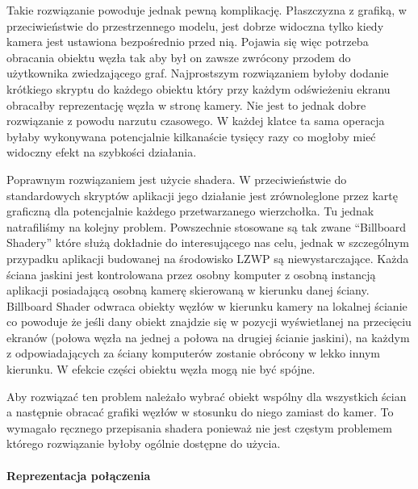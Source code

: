 Takie rozwiązanie powoduje jednak pewną komplikację. Płaszczyzna z grafiką, w przeciwieństwie do przestrzennego modelu, jest dobrze widoczna tylko kiedy kamera jest ustawiona bezpośrednio przed nią. Pojawia się więc potrzeba obracania obiektu węzła tak aby był on zawsze zwrócony przodem do użytkownika zwiedzającego graf. Najprostszym rozwiązaniem byłoby dodanie krótkiego skryptu do każdego obiektu który przy każdym odświeżeniu ekranu obracałby reprezentację węzła w stronę kamery. Nie jest to jednak dobre rozwiązanie z powodu narzutu czasowego. W każdej klatce ta sama operacja byłaby wykonywana potencjalnie kilkanaście tysięcy razy co mogłoby mieć widoczny efekt na szybkości działania.

Poprawnym rozwiązaniem jest użycie shadera. W przeciwieństwie do standardowych skryptów aplikacji jego działanie jest zrównoleglone przez kartę graficzną dla potencjalnie każdego przetwarzanego wierzchołka. Tu jednak natrafiliśmy na kolejny problem. Powszechnie stosowane są tak zwane ``Billboard Shadery'' które służą dokładnie do interesującego nas celu, jednak w szczególnym przypadku aplikacji budowanej na środowisko LZWP są niewystarczające. Każda ściana jaskini jest kontrolowana przez osobny komputer z osobną instancją aplikacji posiadającą osobną kamerę skierowaną w kierunku danej ściany. Billboard Shader odwraca obiekty węzłów w kierunku kamery na lokalnej ścianie co powoduje że jeśli dany obiekt znajdzie się w pozycji wyświetlanej na przecięciu ekranów (połowa węzła na jednej a połowa na drugiej ścianie jaskini), na każdym z odpowiadających za ściany komputerów zostanie obrócony w lekko innym kierunku. W efekcie części obiektu węzła mogą nie być spójne.

Aby rozwiązać ten problem należało wybrać obiekt wspólny dla wszystkich ścian a następnie obracać grafiki węzłów w stosunku do niego zamiast do kamer. To wymagało ręcznego przepisania shadera ponieważ nie jest częstym problemem którego rozwiązanie byłoby ogólnie dostępne do użycia.

\paragraph{Reprezentacja połączenia} 

